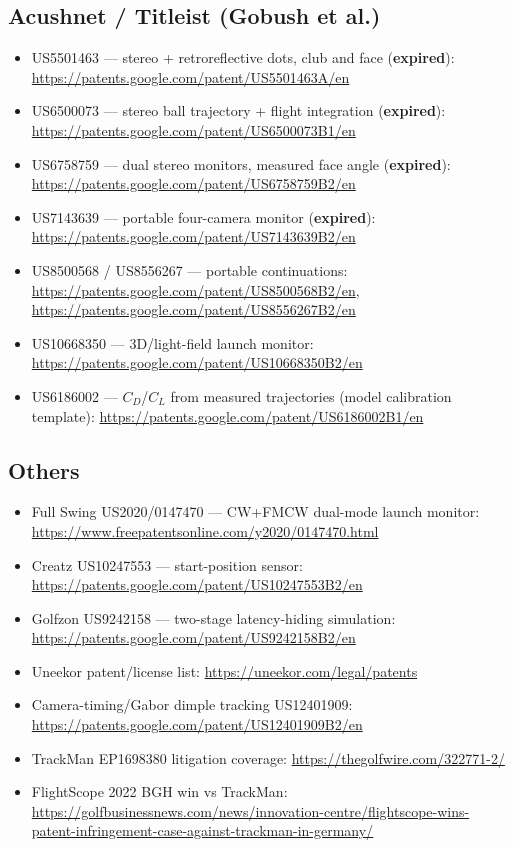 \subsection*{Acushnet / Titleist (Gobush et al.)}
\begin{itemize}\small
\item US5501463 --- stereo + retroreflective dots, club and face
  (\textbf{expired}): \url{https://patents.google.com/patent/US5501463A/en}
\item US6500073 --- stereo ball trajectory + flight integration
  (\textbf{expired}): \url{https://patents.google.com/patent/US6500073B1/en}
\item US6758759 --- dual stereo monitors, measured face angle
  (\textbf{expired}): \url{https://patents.google.com/patent/US6758759B2/en}
\item US7143639 --- portable four-camera monitor (\textbf{expired}):
  \url{https://patents.google.com/patent/US7143639B2/en}
\item US8500568 / US8556267 --- portable continuations:
  \url{https://patents.google.com/patent/US8500568B2/en},
  \url{https://patents.google.com/patent/US8556267B2/en}
\item US10668350 --- 3D/light-field launch monitor:
  \url{https://patents.google.com/patent/US10668350B2/en}
\item US6186002 --- $C_D$/$C_L$ from measured trajectories (model
  calibration template):
  \url{https://patents.google.com/patent/US6186002B1/en}
\end{itemize}

\subsection*{Others}
\begin{itemize}\small
\item Full Swing US2020/0147470 --- CW+FMCW dual-mode launch monitor:
  \url{https://www.freepatentsonline.com/y2020/0147470.html}
\item Creatz US10247553 --- start-position sensor:
  \url{https://patents.google.com/patent/US10247553B2/en}
\item Golfzon US9242158 --- two-stage latency-hiding simulation:
  \url{https://patents.google.com/patent/US9242158B2/en}
\item Uneekor patent/license list: \url{https://uneekor.com/legal/patents}
\item Camera-timing/Gabor dimple tracking US12401909:
  \url{https://patents.google.com/patent/US12401909B2/en}
\item TrackMan EP1698380 litigation coverage:
  \url{https://thegolfwire.com/322771-2/}
\item FlightScope 2022 BGH win vs TrackMan:
  \url{https://golfbusinessnews.com/news/innovation-centre/flightscope-wins-patent-infringement-case-against-trackman-in-germany/}
\end{itemize}


